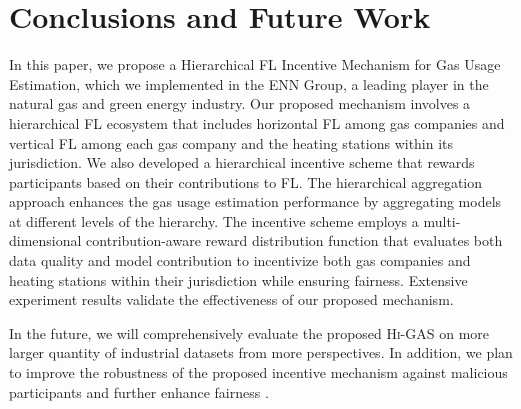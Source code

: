 \documentclass{article}
\newcommand{\methodname}{\textsc{Hi-GAS}}
\begin{document}
\section{Conclusions and Future Work}
In this paper, we propose a Hierarchical FL Incentive Mechanism for Gas Usage Estimation, which we implemented in the ENN Group, a leading player in the natural gas and green energy industry. Our proposed mechanism involves a hierarchical FL ecosystem that includes horizontal FL among gas companies and vertical FL among each gas company and the heating stations within its jurisdiction. We also developed a hierarchical incentive scheme that rewards participants based on their contributions to FL.
The hierarchical aggregation approach enhances the gas usage estimation performance by aggregating models at different levels of the hierarchy. The incentive scheme employs a multi-dimensional contribution-aware reward distribution function that evaluates both data quality and model contribution to incentivize both gas companies and heating stations within their jurisdiction while ensuring fairness. Extensive experiment results validate the effectiveness of our proposed mechanism.

In the future, we will comprehensively evaluate the proposed \methodname{} on more larger quantity of industrial datasets from more perspectives. In addition, we plan to improve the robustness of the proposed incentive mechanism against malicious participants \cite{lyu2022privacy} and further enhance fairness \cite{shi2023towards}.





\end{document}
